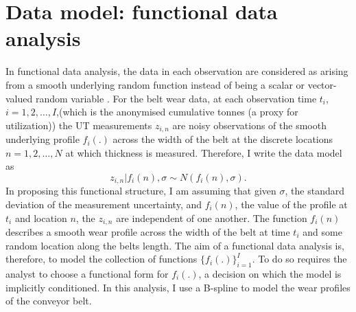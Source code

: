 \section{Data model: functional data analysis} \label{sec:belt-wear-fda}
In functional data analysis, the data in each observation are considered as arising from a smooth underlying random function instead of being a scalar or vector-valued random variable \citep[p. 512]{BDA2020}. 
For the belt wear data, at each observation time $t_i$, $i = 1, 2, \dots, I$,(which is the anonymised cumulative tonnes (a proxy for utilization)) the UT measurements $z_{i,n}$ are noisy observations of the smooth underlying profile $f_i(.)$ across the width of the belt at the discrete locations $n = 1, 2, \dots, N$ at which thickness is measured. Therefore, I write the data model as
\begin{equation}
  z_{i, n}|f_i(n),\sigma \sim N(f_i(n), \sigma).
  \label{eq:fda}
\end{equation}
In proposing this functional structure, I am assuming that given $\sigma$, the standard deviation of the measurement uncertainty, and $f_i(n)$, the value of the profile at $t_i$ and location $n$, the $z_{i,n}$ are independent of one another. The function $f_i(n)$ describes a smooth wear profile across the width of the belt at time $t_i$ and some random location along the belts length. The aim of a functional data analysis is, therefore, to model the collection of functions $\{f_i(.)\}^I_{i = 1}$. To do so requires the analyst to choose a functional form for $f_i(.)$, a decision on which the model is implicitly conditioned. In this analysis, I use a B-spline to model the wear profiles of the conveyor belt.

